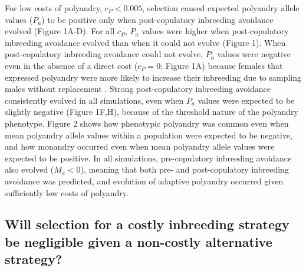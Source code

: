 \documentclass[10pt,letterpaper]{article}
\begin{document}
For low costs of polyandry, $c_{P} < 0.005$, selection caused expected polyandry allele values ($P_{a}$) to be positive only when post-copulatory inbreeding avoidance evolved (Figure 1A-D). For all $c_{P}$, $P_{a}$ values were higher when post-copulatory inbreeding avoidance evolved than when it could not evolve (Figure 1). When post-copulatory inbreeding avoidance could not evolve, $P_{a}$ values were negative even in the absence of a direct cost ($c_{P}=0$; Figure 1A) because females that expressed polyandry were more likely to increase their inbreeding due to sampling males without replacement \cite[][]{Duthie}. Strong post-copulatory inbreeding avoidance consistently evolved in all simulations, even when $P_{a}$ values were expected to be slightly negative (Figure 1F,H), because of the threshold nature of the polyandry phenotype. Figure 2 shows how phenotypic polyandry was common even when mean polyandry allele values within a population were expected to be negative, and how monandry occurred even when mean polyandry allele values were expected to be positive. In all simulations, pre-copulatory inbreeding avoidance also evolved ($M_{a}<0$), meaning that both pre- and post-copulatory inbreeding avoidance was predicted, and evolution of adaptive polyandry occurred given sufficiently low costs of polyandry.

\subsection*{Will selection for a costly inbreeding strategy be negligible given a non-costly alternative strategy?}
\end{document}
